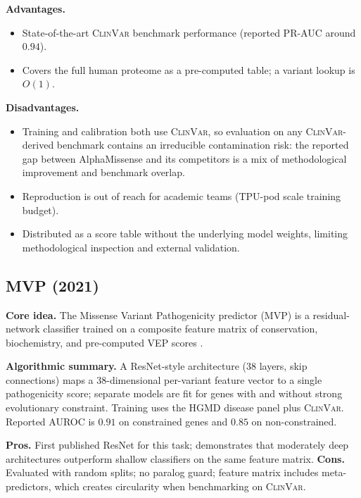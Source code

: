 \documentclass[11pt,a4paper,oneside]{report}
\begin{document}
\textbf{Advantages.}
\begin{itemize}[leftmargin=2em, itemsep=0.15em]
  \item State-of-the-art \textsc{ClinVar} benchmark
    performance (reported PR-AUC around $0.94$).
  \item Covers the full human proteome as a pre-computed
    table; a variant lookup is $O(1)$.
\end{itemize}

\textbf{Disadvantages.}
\begin{itemize}[leftmargin=2em, itemsep=0.15em]
  \item Training and calibration both use
    \textsc{ClinVar}, so evaluation on any
    \textsc{ClinVar}-derived benchmark contains an
    irreducible contamination risk: the reported gap
    between AlphaMissense and its competitors is a
    mix of methodological improvement and benchmark
    overlap.
  \item Reproduction is out of reach for academic teams
    (TPU-pod scale training budget).
  \item Distributed as a score table without the underlying
    model weights, limiting methodological inspection
    and external validation.
\end{itemize}


\subsection{MVP (2021) \texorpdfstring{\citep{qi2021mvp}}{(Qi et al., 2021)}}
\label{sec:rw-mvp}

\textbf{Core idea.} The Missense Variant Pathogenicity predictor (MVP) is
a residual-network classifier trained on a composite feature matrix of
conservation, biochemistry, and pre-computed VEP scores
\citep{qi2021mvp}.

\textbf{Algorithmic summary.} A ResNet-style architecture (38 layers,
skip connections) maps a 38-dimensional per-variant feature vector to
a single pathogenicity score; separate models are fit for genes with
and without strong evolutionary constraint. Training uses the HGMD
disease panel plus \textsc{ClinVar}. Reported AUROC is $0.91$ on
constrained genes and $0.85$ on non-constrained.

\textbf{Pros.} First published ResNet for this task; demonstrates that
moderately deep architectures outperform shallow classifiers on the
same feature matrix. \textbf{Cons.} Evaluated with random
splits; no paralog guard; feature matrix includes meta-predictors,
which creates circularity when benchmarking on \textsc{ClinVar}.
\end{document}
